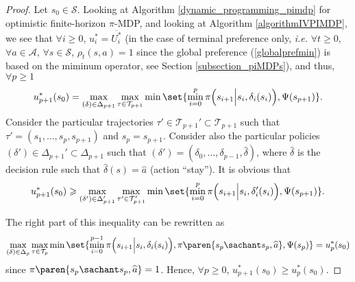 \begin{proof}
Let $s_0 \in \mathcal{S}$. 
Looking at Algorithm \ref{dynamic_programming_pimdp}
for optimistic finite-horizon $\pi$-MDP, 
and looking at Algorithm \ref{algorithmIVPIMDP}, 
we see that $\forall i \geqslant 0$,
$u^*_i = \overline{U_i^*}$ 
(in the case of terminal preference only, 
\textit{i.e.} $\forall t \geqslant 0$, 
$\forall a \in \mathcal{A}$, 
$\forall s \in \mathcal{S}$, $\rho_t(s,a)=1$
since the global preference (\ref{globalprefmin}) 
is based on the miminum operator,
see Section \ref{subsection_piMDPs}),
and thus, $\forall p \geqslant 1$
\[ u^*_{p+1}(s_0) 
= \displaystyle \max_{(\delta) \in \Delta_{p+1}} \max_{\tau \in \mathcal{T}_{p+1} } 
\min \set{ \min_{i=0}^p \pi \Big( s_{i+1} \Big\vert s_i,\delta_i(s_i) \Big), \Psi(s_{p+1}) }. \]
Consider the particular trajectories 
$\tau' \in \mathcal{T}_{p+1}' \subset \mathcal{T}_{p+1}$ 
such that $\tau'=(s_1,\ldots,s_p,s_{p+1})$
and $s_p=s_{p+1}$.
Consider also the particular policies 
$(\delta') \in \Delta_{p+1}' \subset \Delta_{p+1}$ 
such that 
$(\delta')=(\delta_0,\ldots,\delta_{p-1},\widehat{\delta})$,
where $\widehat{\delta}$ 
is the decision rule such that 
$\widehat{\delta}(s) = \widehat{a}$ 
(action ``stay''). 
It is obvious that 
\[ u^*_{p+1}(s_0) 
\geqslant \displaystyle \max_{(\delta') \in \Delta_{p+1}' } 
\max_{\tau' \in \mathcal{T}_{p+1}'} 
\min \set{ \min_{i=0}^p \pi \Big( s_{i+1} \Big\vert s_i,\delta_i'(s_i) \Big), \Psi(s_{p+1}) } . \] 

The right part of this inequality can be rewritten as
\[ \max_{(\delta) \in \Delta_{p} } \max_{\tau \in \mathcal{T}_{p}} 
\min \set{ \min_{i=0}^{p-1} \pi \Big( s_{i+1} \Big\vert s_i, \delta_i(s_i) \Big), \pi \paren{ s_p \sachant s_p, \widehat{a} }, \Psi(s_{p}) } = u^*_p(s_0) \]
 since $ \pi \paren{ s_p \sachant s_p, \widehat{a} } = 1$.
Hence, $\forall p \geqslant 0$, 
$u^*_{p+1}(s_0) \geqslant u^*_p(s_0)$.
\end{proof}
